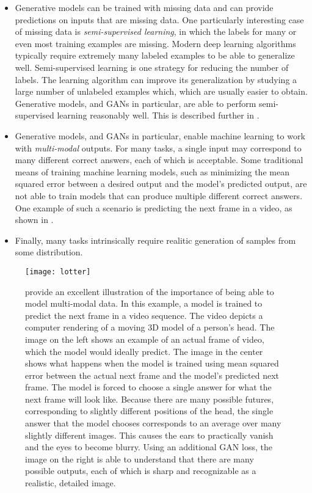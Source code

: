 \begin{itemize}
\item Generative models can be trained with missing data and can provide predictions
  on inputs that are missing data.
  One particularly interesting case of missing data is {\em semi-supervised learning},
  in which the labels for many or even most training examples are missing.
  Modern deep learning algorithms typically require extremely many labeled examples
  to be able to generalize well.
  Semi-supervised learning is one strategy for reducing the number of labels.
  The learning algorithm can improve its generalization by studying a large number
  of unlabeled examples which, which are usually easier to obtain.
  Generative models, and GANs in particular, are able to perform semi-supervised
  learning reasonably well. This is described further in .

\item Generative models, and GANs in particular, enable machine learning to work with
  {\em multi-modal} outputs.
  For many tasks, a single input may correspond to many different correct answers,
  each of which is acceptable.
Some traditional means of training machine learning models, such as minimizing the
mean squared error between a desired output and the model's predicted output, are
not able to train models that can produce multiple different correct answers.
One example of such a scenario is predicting the next frame in a video, as shown
in .

\item Finally, many tasks intrinsically require realitic generation of samples from
  some distribution.
\end{itemize}

\begin{figure}
\centering
\texttt{[image: lotter]}
\caption{
\citet{lotter2015unsupervised} provide an excellent illustration of the importance
of being able to model multi-modal data.
In this example, a model is trained to predict the next frame in a video sequence.
The video depicts a computer rendering of a moving 3D model of a person's head.
The image on the left shows an example of an actual frame of video, which the model
would ideally predict.
The image in the center shows what happens when the model is trained using mean
squared error between the actual next frame and the model's predicted next frame.
The model is forced to choose a single answer for what the next frame will look like.
Because there are many possible futures, corresponding to slightly different positions
of the head, the single answer that the model chooses corresponds to an average over
many slightly different images.
This causes the ears to practically vanish and the eyes to become blurry.
Using an additional GAN loss, the image on the right is able to understand that there
are many possible outputs, each of which is sharp and recognizable as a realistic,
detailed image.
}
  \label{fig:lotter}
\end{figure}

